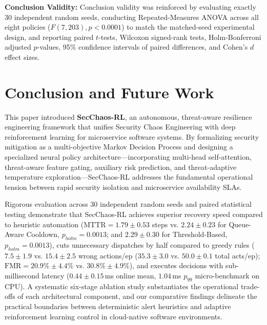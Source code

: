 \documentclass[ASNA,twocolumn]{USG}
\begin{document}
\textbf{Conclusion Validity:} Conclusion validity was reinforced by evaluating exactly 30 independent random seeds, conducting Repeated-Measures ANOVA across all eight policies ($F(7, 203), p < 0.0001$) to match the matched-seed experimental design, and reporting paired $t$-tests, Wilcoxon signed-rank tests, Holm-Bonferroni adjusted $p$-values, 95\% confidence intervals of paired differences, and Cohen's $d$ effect sizes.

\section{Conclusion and Future Work}
\label{sec:conclusion}

This paper introduced \textbf{SecChaos-RL}, an autonomous, threat-aware resilience engineering framework that unifies Security Chaos Engineering with deep reinforcement learning for microservice software systems. By formalizing security mitigation as a multi-objective Markov Decision Process and designing a specialized neural policy architecture—incorporating multi-head self-attention, threat-aware feature gating, auxiliary risk prediction, and threat-adaptive temperature exploration—SecChaos-RL addresses the fundamental operational tension between rapid security isolation and microservice availability SLAs.

Rigorous evaluation across 30 independent random seeds and paired statistical testing demonstrate that SecChaos-RL achieves superior recovery speed compared to heuristic automation ($\text{MTTR} = 1.79 \pm 0.53$ steps vs. $2.24 \pm 0.23$ for Queue-Aware Cooldown, $p_{holm} = 0.0013$; and $2.29 \pm 0.30$ for Threshold-Based, $p_{holm} = 0.0013$), cuts unnecessary dispatches by half compared to greedy rules ($7.5 \pm 1.9$ vs. $15.4 \pm 2.5$ wrong actions/ep ($35.3 \pm 3.0$ vs. $50.0 \pm 0.1$ total acts/ep); $\text{FMR} = 20.9\% \pm 4.4\%$ vs. $30.8\% \pm 4.9\%$), and executes decisions with sub-millisecond latency ($0.44 \pm 0.15$\,ms online mean, $1.04$\,ms $p_{99}$ micro-benchmark on CPU). A systematic six-stage ablation study substantiates the operational trade-offs of each architectural component, and our comparative findings delineate the practical boundaries between deterministic alert heuristics and adaptive reinforcement learning control in cloud-native software environments.
\end{document}
